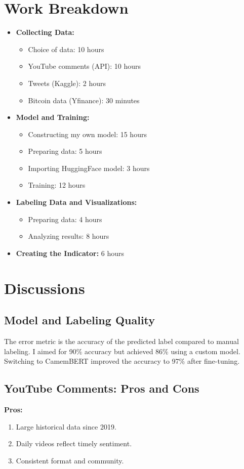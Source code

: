 \documentclass[12pt,a4paper]{article}
\begin{document}
\section{Work Breakdown} \label{sec:work_breakdown}
\begin{itemize}
    \item \textbf{Collecting Data:}
    \begin{itemize}
        \item Choice of data: 10 hours
        \item YouTube comments (API): 10 hours
        \item Tweets (Kaggle): 2 hours
        \item Bitcoin data (Yfinance): 30 minutes
    \end{itemize}
    \item \textbf{Model and Training:}
    \begin{itemize}
        \item Constructing my own model: 15 hours
        \item Preparing data: 5 hours
        \item Importing HuggingFace model: 3 hours
        \item Training: 12 hours
    \end{itemize}
    \item \textbf{Labeling Data and Visualizations:}
    \begin{itemize}
        \item Preparing data: 4 hours
        \item Analyzing results: 8 hours
    \end{itemize}
    \item \textbf{Creating the Indicator:} 6 hours
\end{itemize}

\section{Discussions} \label{sec:discussions}

\subsection*{Model and Labeling Quality}
The error metric is the accuracy of the predicted label compared to manual labeling. I aimed for 90\% accuracy but achieved 86\% using a custom model. Switching to CamemBERT improved the accuracy to 97\% after fine-tuning.

\subsection*{YouTube Comments: Pros and Cons}
\textbf{Pros:}
\begin{enumerate}
    \item Large historical data since 2019.
    \item Daily videos reflect timely sentiment.
    \item Consistent format and community.
\end{enumerate}
\end{document}
